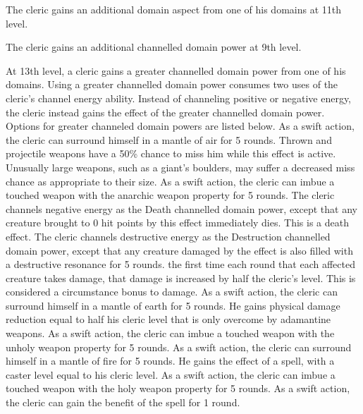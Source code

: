 \par The cleric gains an additional domain aspect from one of his domains at 11th level.

 The cleric gains an additional channelled domain power at 9th level.

 At 13th level, a cleric gains a greater channelled domain power from one of his domains. Using a greater channelled domain power consumes two uses of the cleric's channel energy ability. Instead of channeling positive or negative energy, the cleric instead gains the effect of the greater channelled domain power. Options for greater channeled domain powers are listed below.
 As a swift action, the cleric can surround himself in a mantle of air for 5 rounds. Thrown and projectile weapons have a 50\% chance to miss him while this effect is active. Unusually large weapons, such as a giant's boulders, may suffer a decreased miss chance as appropriate to their size.
 As a swift action, the cleric can imbue a touched weapon with the anarchic weapon property for 5 rounds.
 The cleric channels negative energy as the Death channelled domain power, except that any creature brought to 0 hit points by this effect immediately dies. This is a death effect.
 The cleric channels destructive energy as the Destruction channelled domain power, except that any creature damaged by the effect is also filled with a destructive resonance for 5 rounds. the first time each round that each affected creature takes damage, that damage is increased by half the cleric's level. This is considered a circumstance bonus to damage.
 As a swift action, the cleric can surround himself in a mantle of earth for 5 rounds. He gains physical damage reduction equal to half his cleric level that is only overcome by adamantine weapons.
 As a swift action, the cleric can imbue a touched weapon with the unholy weapon property for 5 rounds.
 As a swift action, the cleric can surround himself in a mantle of fire for 5 rounds. He gains the effect of a  spell, with a caster level equal to his cleric level.
 As a swift action, the cleric can imbue a touched weapon with the holy weapon property for 5 rounds.
 As a swift action, the cleric can gain the benefit of the  spell for 1 round.
